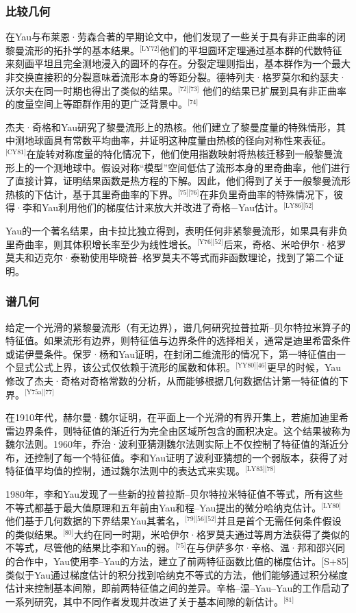 \subsubsection{比较几何}
在Yau与布莱恩·劳森合著的早期论文中，他们发现了一些关于具有非正曲率的闭黎曼流形的拓扑学的基本结果。\(^\text{[LY72]}\)他们的平坦圆环定理通过基本群的代数特征来刻画平坦且完全测地浸入的圆环的存在。分裂定理则指出，基本群作为一个最大非交换直接积的分裂意味着流形本身的等距分裂。德特列夫·格罗莫尔和约瑟夫·沃尔夫在同一时期也得出了类似的结果。\(^\text{[72][73]}\) 他们的结果已扩展到具有非正曲率的度量空间上等距群作用的更广泛背景中。\(^\text{[74]}\)

杰夫·奇格和Yau研究了黎曼流形上的热核。他们建立了黎曼度量的特殊情形，其中测地球面具有常数平均曲率，并证明这种度量由热核的径向对称性来表征。\(^\text{[CY81]}\)在旋转对称度量的特化情况下，他们使用指数映射将热核迁移到一般黎曼流形上的一个测地球中。假设对称“模型”空间低估了流形本身的里奇曲率，他们进行了直接计算，证明结果函数是热方程的下解。因此，他们得到了关于一般黎曼流形热核的下估计，基于其里奇曲率的下界。\(^\text{[75][76]}\)在非负里奇曲率的特殊情况下，彼得·李和Yau利用他们的梯度估计来放大并改进了奇格−Yau估计。\(^\text{[LY86][52]}\)

Yau的一个著名结果，由卡拉比独立得到，表明任何非紧黎曼流形，如果具有非负里奇曲率，则其体积增长率至少为线性增长。\(^\text{[Y76][52]}\)后来，奇格、米哈伊尔·格罗莫夫和迈克尔·泰勒使用毕晓普–格罗莫夫不等式而非函数理论，找到了第二个证明。
\subsubsection{谱几何}
给定一个光滑的紧黎曼流形（有无边界），谱几何研究拉普拉斯–贝尔特拉米算子的特征值。如果流形有边界，则特征值与边界条件的选择相关，通常是迪里希雷条件或诺伊曼条件。保罗·杨和Yau证明，在封闭二维流形的情况下，第一特征值由一个显式公式上界，该公式仅依赖于流形的属数和体积。\(^\text{[YY80][46]}\)更早的时候，Yau修改了杰夫·奇格对奇格常数的分析，从而能够根据几何数据估计第一特征值的下界。\(^\text{[Y75a][77]}\)

在1910年代，赫尔曼·魏尔证明，在平面上一个光滑的有界开集上，若施加迪里希雷边界条件，则特征值的渐近行为完全由区域所包含的面积决定。这个结果被称为魏尔法则。1960年，乔治·波利亚猜测魏尔法则实际上不仅控制了特征值的渐近分布，还控制了每一个特征值。李和Yau证明了波利亚猜想的一个弱版本，获得了对特征值平均值的控制，通过魏尔法则中的表达式来实现。\(^\text{[LY83][78]}\)

1980年，李和Yau发现了一些新的拉普拉斯–贝尔特拉米特征值不等式，所有这些不等式都基于最大值原理和五年前由Yau和程–Yau提出的微分哈纳克估计。\(^\text{[LY80]}\)他们基于几何数据的下界结果Yau其著名，\(^\text{[79][56][52]}\)并且是首个无需任何条件假设的类似结果。\(^\text{[80]}\)大约在同一时期，米哈伊尔·格罗莫夫通过等周方法获得了类似的不等式，尽管他的结果比李和Yau的弱。\(^\text{[75]}\)在与伊萨多尔·辛格、温·邦和邵兴同的合作中，Yau使用李–Yau的方法，建立了前两特征函数比值的梯度估计。[S+85] 类似于Yau通过梯度估计的积分找到哈纳克不等式的方法，他们能够通过积分梯度估计来控制基本间隙，即前两特征值之间的差异。辛格–温–Yau–Yau的工作启动了一系列研究，其中不同作者发现并改进了关于基本间隙的新估计。\(^\text{[81]}\)

